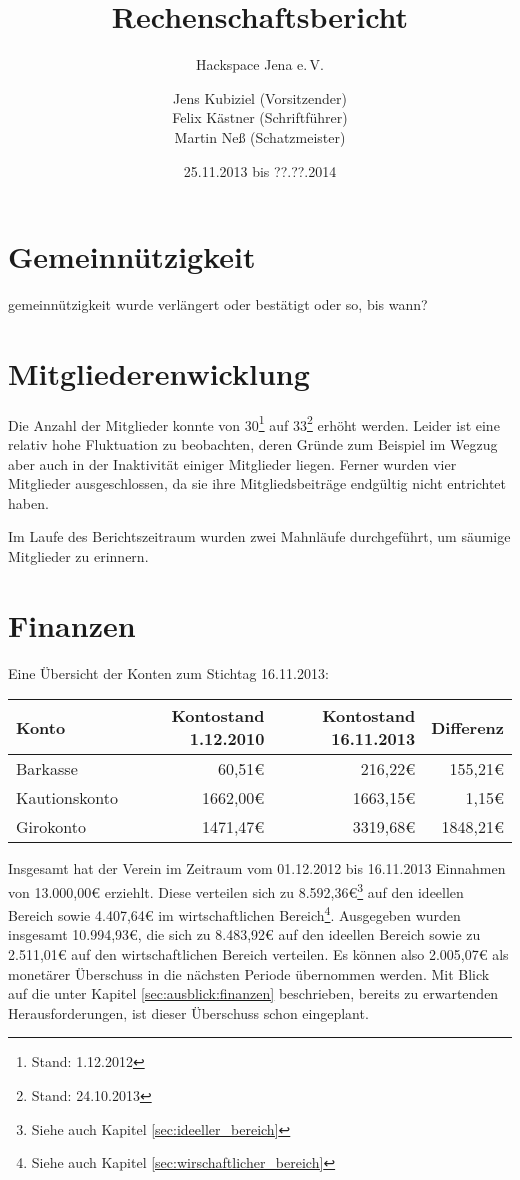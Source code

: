 \documentclass[10pt,DIV16]{scrartcl}
\title{Rechenschaftsbericht}
\subtitle{Hackspace Jena e.\,V.}
\author{%
	Jens Kubiziel (Vorsitzender)\\
    Felix Kästner (Schriftführer)\\
	Martin Neß (Schatzmeister)
}
\date{25.11.2013 bis ??.??.2014}
\begin{document}
\maketitle{}

\tableofcontents{}

\newpage{}

\section{Gemeinnützigkeit}

gemeinnützigkeit wurde verlängert oder bestätigt oder so, bis wann?

\section{Mitgliederenwicklung}

Die Anzahl der Mitglieder konnte von 30\footnote{Stand: 1.12.2012} auf 
33\footnote{Stand: 24.10.2013} erhöht werden. Leider ist eine relativ 
hohe Fluktuation zu beobachten, deren Gründe zum Beispiel im Wegzug aber 
auch in der Inaktivität einiger Mitglieder liegen. Ferner wurden vier Mitglieder 
ausgeschlossen, da sie ihre Mitgliedsbeiträge endgültig nicht entrichtet 
haben.

Im Laufe des Berichtszeitraum wurden zwei Mahnläufe durchgeführt, um 
säumige Mitglieder zu erinnern. 

\section{Finanzen}

Eine Übersicht der Konten zum Stichtag 16.11.2013:

\begin{table}[h]
\begin{tabular}{l|r|r|r}
\textbf{Konto} & \textbf{Kontostand 1.12.2010} & \textbf{Kontostand 16.11.2013} & \textbf{Differenz} \\ \hline
Barkasse & 60,51\euro & 216,22\euro & 155,21\euro \\
Kautionskonto & 1662,00\euro & 1663,15\euro & 1,15\euro \\
Girokonto & 1471,47\euro & 3319,68\euro & 1848,21\euro \\ \hline
\end{tabular}
\end{table}

Insgesamt hat der Verein im Zeitraum vom 01.12.2012 bis 16.11.2013 Einnahmen 
von 13.000,00\euro{} erziehlt. Diese verteilen sich zu 
8.592,36\euro\footnote{Siehe auch Kapitel \ref{sec:ideeller_bereich}} auf 
den ideellen Bereich sowie 4.407,64\euro{} im wirtschaftlichen 
Bereich\footnote{Siehe auch Kapitel \ref{sec:wirschaftlicher_bereich}}. 
Ausgegeben wurden insgesamt 10.994,93\euro, die sich zu 8.483,92\euro{} 
auf den ideellen Bereich sowie zu 2.511,01\euro{} auf den wirtschaftlichen 
Bereich verteilen. Es können also 2.005,07\euro{} als monetärer 
Überschuss in die nächsten Periode übernommen werden. Mit Blick auf die 
unter Kapitel \ref{sec:ausblick:finanzen} beschrieben, bereits zu 
erwartenden Herausforderungen, ist dieser Überschuss schon 
eingeplant.
\end{document}
